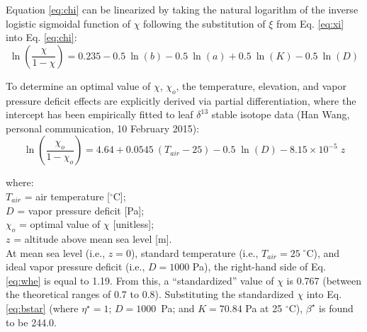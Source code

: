 Equation \ref{eq:chi} can be linearized by taking the natural logarithm of the inverse logistic sigmoidal function of $\chi$ following the substitution of $\xi$ from Eq. \ref{eq:xi} into Eq. \ref{eq:chi}:
\begin{equation}
\label{eq:logit}
    \ln \left( \frac{\chi}{1 - \chi} \right) = 
    	0.235 - 0.5\:\ln(b) - 0.5\:\ln(a) + 0.5\:\ln(K) - 0.5\:\ln(D)
\end{equation}

\noindent To determine an optimal value of $\chi$, $\chi_o$, the temperature, elevation, and vapor pressure deficit effects are explicitly derived via partial differentiation, where the intercept has been empirically fitted to leaf $\delta^{13}$ stable isotope data (Han Wang, personal communication, 10 February 2015):
\begin{equation}
\label{eq:whe}
    \ln \left(\frac{\chi_o}{1 - \chi_o}\right) = 4.64 + 
    	0.0545\: \left(T_{air} - 25\right) - 
    	0.5\; \ln (D) - 
    	8.15\times 10^{-5}\; z
\end{equation}

\noindent where:\\
\indent $T_{air}$ = air temperature [${}^\circ$C];\\
\indent $D$ = vapor pressure deficit [Pa];\\
\indent $\chi_o$ = optimal value of $\chi$ [unitless];\\
\indent $z$ = altitude above mean sea level [m].\\

\noindent At mean sea level (i.e., $z = 0$), standard temperature (i.e., $T_{air} = 25\;{}^\circ$C), and ideal vapor pressure deficit (i.e., $D = 1000$ Pa), the right-hand side of Eq. \ref{eq:whe} is equal to 1.19. From this, a ``standardized'' value of $\chi$ is 0.767 (between the theoretical ranges of 0.7 to 0.8). 
Substituting the standardized $\chi$ into Eq. \ref{eq:bstar} (where $\eta^\star = 1$; $D = 1000$~Pa; and $K = 70.84$ Pa at 25 ${}^\circ$C), $\beta^\star$ is found to be 244.0. 

